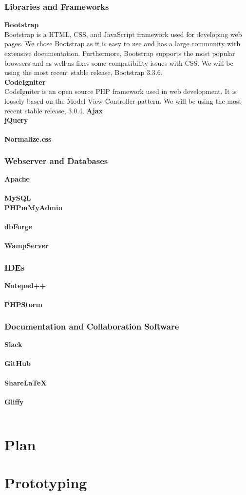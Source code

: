 \documentclass[12pt]{article}
\begin{document}
\subsubsection{Libraries and Frameworks} 
\textbf{Bootstrap}\\
Bootstrap is a HTML, CSS, and JavaScript framework used for developing web pages. We chose Bootstrap as it is easy to use and has a large community with extensive documentation. Furthermore, Bootstrap supports the most popular browsers and as well as fixes some compatibility issues with CSS. We will be using the most recent stable release, Bootstrap 3.3.6.
\\
%
\textbf{CodeIgniter} \label{codeIgniter} \\
CodeIgniter is an open source PHP framework used in web development. It is loosely based on the Model-View-Controller pattern. We will be using the most recent stable release, 3.0.4.
%
\textbf{Ajax}\\
%
\textbf{jQuery}\\
\\
%
\textbf{Normalize.css}
\\
%
%
%
\subsubsection{Webserver and Databases} \label{webanddata} 
\textbf{Apache}\\
\\

\textbf{MySQL} \label{MySQL} \\

\textbf{PHPmMyAdmin}\\
\\
%
\textbf{dbForge}\\
\\
%
\textbf{WampServer}
\\
%
\subsubsection{IDEs}
\textbf{Notepad++}\\
\\
%
\textbf{PHPStorm}
\\
%
%
%
\subsubsection{Documentation and Collaboration Software}
\textbf{Slack}\\
\\
%
\textbf{GitHub}\\
\\
%
\textbf{ShareLaTeX}\\
\\
%
\textbf{Gliffy}\\
\\
%

\section{Plan}

\section{Prototyping}
\end{document}
